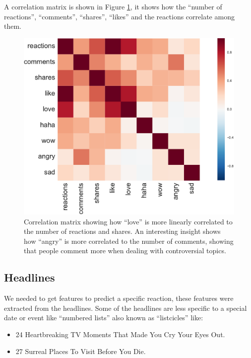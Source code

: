 \documentclass[10pt]{article}
\begin{document}
A correlation matrix is shown in Figure \ref{fig:corr}, it shows how the ``number of reactions'', ``comments'', ``shares'', ``likes'' and the reactions correlate among them.

\begin{figure}[ht!]
\centering
\includegraphics[width=1.0\columnwidth]{../3_notebooks/notebook_figures/corr_mat.pdf}
\caption{Correlation matrix showing how ``love'' is more linearly correlated to the number of reactions and shares. An interesting insight shows how ``angry'' is more correlated to the number of comments, showing that people comment more when dealing with controversial topics.}
\label{fig:corr}
\end{figure}

\subsection{Headlines}

We needed to get features to predict a specific reaction, these features were extracted from the headlines. Some of the headlines are less specific to a special date or event like ``numbered lists'' also known as ``listcicles'' like:
\begin{itemize}
 \item 24 Heartbreaking TV Moments That Made You Cry Your Eyes Out.
 \item 27 Surreal Places To Visit Before You Die.
\end{itemize}
\end{document}
